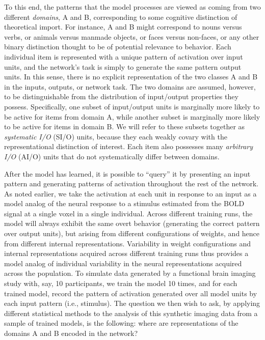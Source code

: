 To this end, the patterns that the model processes are viewed as coming from two different {\em domains}, A and B, corresponding to some cognitive distinction of theoretical import. For instance, A and B might correspond to nouns versus verbs, or animals versus manmade objects, or faces versus non-faces, or any other binary distinction thought to be of potential relevance to behavior.  Each individual item is represented with a unique pattern of activation over input units, and the network's task is simply to generate the same pattern output units. In this sense, there is no explicit representation of the two classes A and B in the inputs, outputs, or network task. The two domains are assumed, however, to be distinguishable from the distribution of input/output properties they possess. Specifically, one subset of input/output units is marginally more likely to be active for items from domain A, while another subset is marginally more likely to be active for items in domain B. We will refer to these subsets together as {\em systematic I/O} (SI/O) units, because they each weakly covary with the representational distinction of interest.  Each item also possesses many {\em arbitrary I/O} (AI/O) units that do not systematically differ between domains.

After the model has learned, it is possible to ``query'' it by presenting an input pattern and generating patterns of activation throughout the rest of the network. As noted earlier, we take the activation at each unit in response to an input as a model analog of the neural response to a stimulus estimated from the BOLD signal at a single voxel in a single individual. Across different training runs, the model will always exhibit the same overt behavior (generating the correct pattern over output units), but arising from different configurations of weights, and hence from different internal representations. Variability in weight configurations and internal representations acquired across different training runs thus provides a model analog of individual variability in the neural representations acquired across the population. To simulate data generated by a functional brain imaging study with, say, 10 participants, we train the model 10 times, and for each trained model, record the pattern of activation generated over all model units by each input pattern (i.e., stimulus). The question we then wish to ask, by applying different statistical methods to the analysis of this synthetic imaging data from a sample of trained models, is the following: where are representations of the domains A and B encoded in the network?

